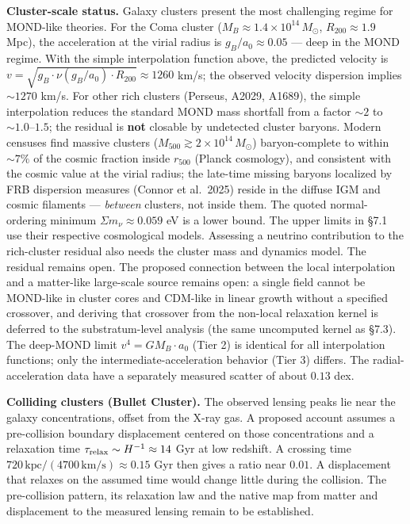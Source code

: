 \documentclass[
]{article}
\begin{document}
\textbf{Cluster-scale status.} Galaxy clusters present the most
challenging regime for MOND-like theories. For the Coma cluster
(\(M_B \approx 1.4 \times 10^{14}\,M_\odot\), \(R_{200} \approx 1.9\)
Mpc), the acceleration at the virial radius is \(g_B/a_0 \approx 0.05\)
--- deep in the MOND regime. With the simple interpolation function
above, the predicted velocity is
\(v = \sqrt{g_B \cdot \nu(g_B/a_0) \cdot R_{200}} \approx 1260\) km/s;
the observed velocity dispersion implies \(\sim 1270\) km/s. For other
rich clusters (Perseus, A2029, A1689), the simple interpolation reduces
the standard MOND mass shortfall from a factor \(\sim 2\) to
\(\sim 1.0\)--\(1.5\); the residual is \textbf{not} closable by
undetected cluster baryons. Modern censuses find massive clusters
(\(M_{500} \gtrsim 2\times10^{14}\,M_\odot\)) baryon-complete to within
\(\sim 7\%\) of the cosmic fraction inside \(r_{500}\) (Planck
cosmology), and consistent with the cosmic value at the virial radius;
the late-time missing baryons localized by FRB dispersion measures
(Connor et al.~2025) reside in the diffuse IGM and cosmic filaments ---
\emph{between} clusters, not inside them. The quoted normal-ordering
minimum \(\Sigma m_\nu\approx0.059\) eV is a lower bound. The upper
limits in §7.1 use their respective cosmological models. Assessing a
neutrino contribution to the rich-cluster residual also needs the
cluster mass and dynamics model. The residual remains open. The proposed
connection between the local interpolation and a matter-like large-scale
source remains open: a single field cannot be MOND-like in cluster cores
and CDM-like in linear growth without a specified crossover, and
deriving that crossover from the non-local relaxation kernel is deferred
to the substratum-level analysis (the same uncomputed kernel as §7.3).
The deep-MOND limit \(v^4 = GM_B \cdot a_0\) (Tier 2) is identical for
all interpolation functions; only the intermediate-acceleration behavior
(Tier 3) differs. The radial-acceleration data have a separately
measured scatter of about \(0.13\) dex.

\textbf{Colliding clusters (Bullet Cluster).} The observed lensing peaks
lie near the galaxy concentrations, offset from the X-ray gas. A
proposed account assumes a pre-collision boundary displacement centered
on those concentrations and a relaxation time
\(\tau_{\rm relax}\sim H^{-1}\approx14\) Gyr at low redshift. A crossing
time \(720\,\text{kpc}/(4700\,\text{km/s})\approx0.15\) Gyr then gives a
ratio near \(0.01\). A displacement that relaxes on the assumed time
would change little during the collision. The pre-collision pattern, its
relaxation law and the native map from matter and displacement to the
measured lensing remain to be established.
\end{document}
